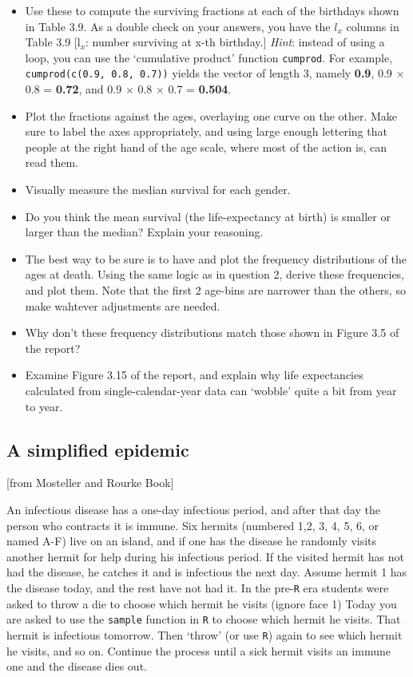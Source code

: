 \documentclass[]{book}
\providecommand{\tightlist}{%
  \setlength{\itemsep}{0pt}\setlength{\parskip}{0pt}}
\begin{document}
\begin{itemize}
\tightlist
\item
  Use these to compute the surviving fractions at each of the birthdays shown in Table 3.9. As a double check on your answers, you have the \(l_x\) columns in Table 3.9 {[}l\(_x\): number surviving at x-th birthday.{]} \emph{Hint}: instead of using a loop, you can use the `cumulative product' function \texttt{cumprod}. For example, \texttt{cumprod(c(0.9,\ 0.8,\ 0.7))} yields the vector of length 3, namely \textbf{0.9}, 0.9 \(\times\) 0.8 = \textbf{0.72}, and 0.9 \(\times\) 0.8 \(\times\) 0.7 = \textbf{0.504}.
\item
  Plot the fractions against the ages, overlaying one curve on the other. Make sure to label the axes appropriately, and using large enough lettering that people at the right hand of the age scale, where most of the action is, can read them.
\item
  Visually measure the median survival for each gender.
\item
  Do you think the mean survival (the life-expectancy at birth) is smaller or larger than the median? Explain your reasoning.
\item
  The best way to be sure is to have and plot the frequency distributions of the ages at death. Using the same logic as in question 2, derive these frequencies, and plot them. Note that the first 2 age-bins are narrower than the others, so make wahtever adjustments are needed.
\item
  Why don't these frequency distributions match those shown in Figure 3.5 of the report?
\item
  Examine Figure 3.15 of the report, and explain why life expectancies calculated from single-calendar-year data can `wobble' quite a bit from year to year.
\end{itemize}

\hypertarget{a-simplified-epidemic}{%
\subsection{A simplified epidemic}\label{a-simplified-epidemic}}

{[}from Mosteller and Rourke Book{]}

An infectious disease has a one-day infectious period, and after that day the person who contracts it is immune. Six hermits (numbered 1,2, 3, 4, 5, 6, or named A-F) live on an island, and if one has the disease he randomly visits another hermit for help during his infectious period. If the visited hermit has not had the disease, he catches it and is infectious the next day. Assume hermit 1 has the disease today, and the rest have not had it. In the pre-\texttt{R} era students were asked to throw a die to choose which hermit he visits (ignore face 1) Today you are asked to use the \texttt{sample} function in \texttt{R} to choose which hermit he visits. That hermit is infectious tomorrow. Then `throw' (or use \texttt{R}) again to see which hermit he visits, and so on. Continue the process until a sick hermit visits an immune one and the disease dies out.
\end{document}
